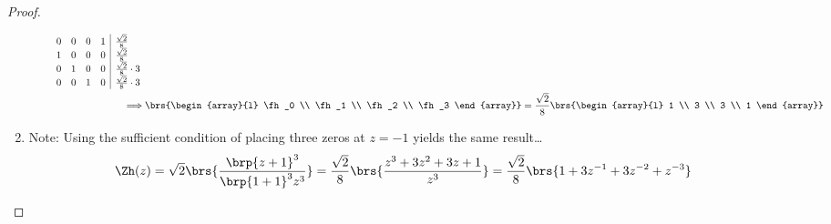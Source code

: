 \begin{proof}
\begin{enumerate}
\begin{enumerate}
\begin{align*}
{\begin{array}{rrrr|l}
                0 &  0 &  0  &  1 & \frac{\sqrt{2}}{8}
            \\  1 &  0 &  0  &  0 & \frac{\sqrt{2}}{8}
            \\  0 &  1 &  0  &  0 & \frac{\sqrt{2}}{8}\cdot3
            \\  0 &  0 &  1  &  0 & \frac{\sqrt{2}}{8}\cdot3
          \end{array}}
          \\
          \implies&
          \brs{\begin{array}{l}
               \fh_0
            \\ \fh_1
            \\ \fh_2
            \\ \fh_3
          \end{array}}
          =
          \frac{\sqrt{2}}{8}\brs{\begin{array}{l}
                  1
               \\ 3
               \\ 3
               \\ 1
          \end{array}}
        \end{align*}

  \end{enumerate}

  \item Note: Using the sufficient condition of placing three zeros at $z=-1$  yields the same result\ldots
    \begin{align*}
      \Zh(z)
        &= \sqrt{2} \brs{\frac{ \brp{z+1}^3 }
                              { \brp{1+1}^3 z^3 }}
         = \frac{\sqrt{2}}{8} \brs{\frac{ z^3 + 3z^2 + 3z + 1 }
                                        { z^3          }}
         = \frac{\sqrt{2}}{8} \brs{ 1 + 3z^{-1} + 3z^{-2} + z^{-3} }
    \end{align*}
\end{enumerate}
\end{proof}

